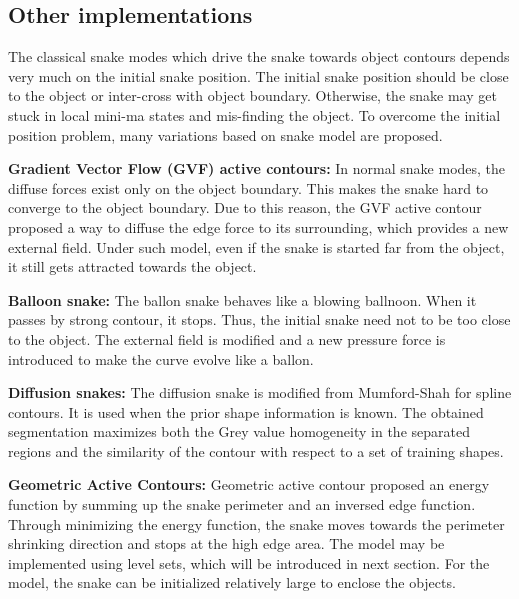 \subsection{Other implementations}
The classical snake modes which drive the snake towards object contours depends very much on the initial snake position.
The initial snake position should be close to the object or inter-cross with object boundary. Otherwise, the snake may
get stuck in local mini-ma states and mis-finding the object. To overcome the initial position problem, many variations
based on snake model are proposed.

\textbf{Gradient Vector Flow (GVF) active contours: } In normal snake modes, the diffuse forces exist only on the object boundary. This 
makes the snake hard to converge to the object boundary. Due to this reason, the GVF active contour proposed a way to diffuse
the edge force to its surrounding, which provides a new external field. Under such model, even if the snake is started far from the object, it still gets attracted 
towards the object\cite{xu1998snakes}.

\textbf{Balloon snake: } The ballon snake \cite{kass1988snakes} behaves like a blowing ballnoon. When it passes by strong contour, it stops. Thus, the
initial snake need not to be too close to the object. The external field is modified and a new pressure force is introduced to make the curve evolve like a ballon.

\textbf{Diffusion snakes: } The diffusion snake \cite{cremers2002diffusion} is modified from Mumford-Shah \cite{mumford2006optimal} for spline contours. It is used 
when the prior shape information is known. The obtained segmentation maximizes both the Grey value homogeneity in the separated regions and the similarity of the contour with respect to a set of training shapes.

\textbf{Geometric Active Contours: } Geometric active contour \cite{malladi1995shape} proposed an energy function by summing up the snake perimeter and an inversed edge function. Through minimizing the energy function, the snake moves towards the perimeter shrinking direction and stops at the high edge area. The model may be implemented using level sets, which will be introduced in next section. For the model, the snake can be initialized relatively large to enclose the objects.
